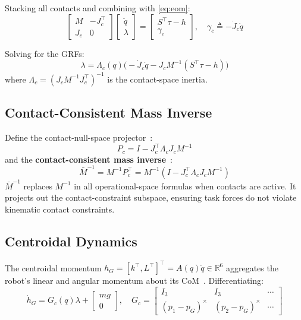 \documentclass[journal]{IEEEtran}
\newcommand{\Mbar}{\bar{M}^{-1}}
\begin{document}
Stacking all contacts and combining with \eqref{eq:eom}:
\begin{equation}\label{eq:KKT}
  \begin{bmatrix}M & -J_c^\top \\ J_c & 0\end{bmatrix}
  \begin{bmatrix}\ddot{q} \\ \lambda\end{bmatrix}
  =\begin{bmatrix}S^\top\tau-h \\ \gamma_c\end{bmatrix},
  \quad \gamma_c\triangleq-\dot{J}_c\dot{q}
\end{equation}

Solving for the GRFs:
\begin{equation}\label{eq:GRF}
  \lambda = \Lambda_c(q)\bigl(-\dot{J}_c\dot{q}-J_cM^{-1}(S^\top\tau-h)\bigr)
\end{equation}
where $\Lambda_c=(J_cM^{-1}J_c^\top)^{-1}$ is the contact-space inertia.

\subsection{Contact-Consistent Mass Inverse}

Define the contact-null-space projector~\cite{khatib1987unified,righetti2011inverse}:
\begin{equation}\label{eq:Pc}
  P_c = I - J_c^\top\Lambda_c J_c M^{-1}
\end{equation}
and the \textbf{contact-consistent mass
inverse}~\cite{khatib1987unified,righetti2011inverse}:
\begin{equation}\label{eq:Mbar}
  \Mbar = M^{-1}P_c^\top = M^{-1}(I-J_c^\top\Lambda_cJ_cM^{-1})
\end{equation}
$\Mbar$ replaces $M^{-1}$ in all operational-space formulas when contacts
are active. It projects out the contact-constraint subspace, ensuring task
forces do not violate kinematic contact constraints.

\subsection{Centroidal Dynamics}

The centroidal momentum $h_G=[k^\top,L^\top]^\top=A(q)\dot{q}\in\mathbb{R}^6$
aggregates the robot's linear and angular momentum about its
CoM~\cite{orin2013centroidal}. Differentiating:
\begin{equation}\label{eq:centroidal}
  \dot{h}_G = G_c(q)\lambda + \begin{bmatrix}mg \\ 0\end{bmatrix},
  \quad
  G_c = \begin{bmatrix}I_3 & I_3 & \cdots \\
                       (p_1{-}p_G)^\times & (p_2{-}p_G)^\times & \cdots\end{bmatrix}
\end{equation}
\end{document}
